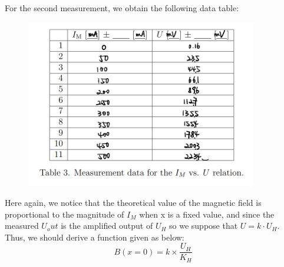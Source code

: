 \documentclass[12pt, a4paper, oneside]{article}
\begin{document}
For the second measurement, we obtain the following data table: 

\begin{figure}[htbp]
	\centering
	\includegraphics[width=0.9\textwidth]{F2.png}
	\label{fig2}
\end{figure}
Here again, we notice that the theoretical value of the magnetic field is proportional to the magnitude of $I_M$ when x is a fixed value, and since the measured
$U_out$ is the amplified output of $U_H$ so we suppose that $U = k·U_H $. Thus, we should derive a function given as below:
\begin{equation}
	B(x=0)=k\times \frac{U_H}{K_H}
\end{equation}
\end{document}
